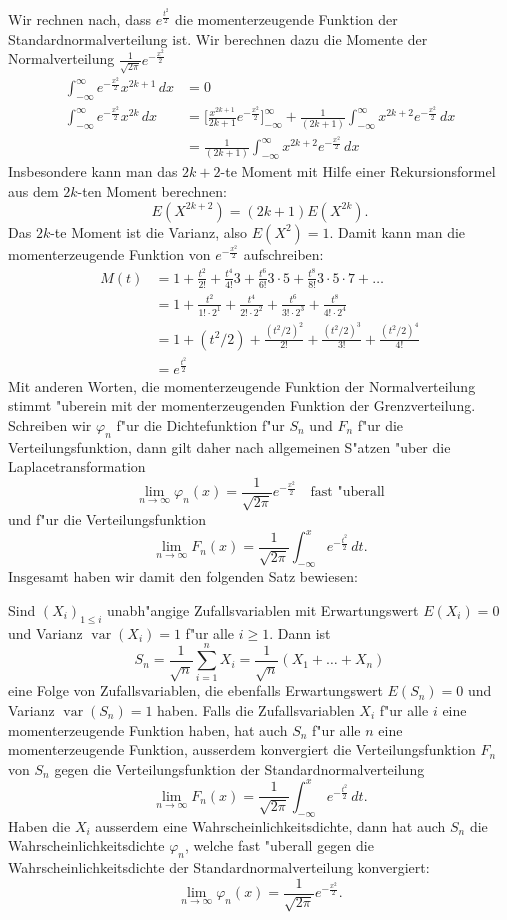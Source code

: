 Wir rechnen nach, dass $e^{\frac{t^2}2}$ die momenterzeugende Funktion
der Standardnormalverteilung ist.
Wir berechnen
dazu die Momente der Normalverteilung $\frac1{\sqrt{2\pi}}e^{-\frac{x^2}2}$
\begin{align*}
\int_{-\infty}^\infty e^{-\frac{x^2}2}x^{2k+1}\,dx&=0\\
\int_{-\infty}^\infty e^{-\frac{x^2}2}x^{2k}\,dx
&=
\biggl[\frac{x^{2k+1}}{2k+1}e^{-\frac{x^2}2}\biggr]_{-\infty}^\infty
+\frac1{(2k+1)}\int_{-\infty}^\infty x^{2k+2}e^{-\frac{x^2}2}\,dx\\
&=
\frac1{(2k+1)}\int_{-\infty}^\infty x^{2k+2}e^{-\frac{x^2}2}\,dx
\end{align*}
Insbesondere kann man das $2k+2$-te Moment mit Hilfe einer
Rekursionsformel aus dem $2k$-ten Moment berechnen:
\[
E(X^{2k+2})=(2k+1)E(X^{2k}).
\]
Das $2k$-te Moment ist die Varianz, also $E(X^2)=1$.
Damit kann
man die momenterzeugende Funktion von $e^{-\frac{x^2}2}$ aufschreiben:
\begin{align*}
M(t)
&=
1+\frac{t^2}{2!} +\frac{t^4}{4!}3 +\frac{t^6}{6!}3\cdot5 +\frac{t^8}{8!}3\cdot5\cdot7+\dots\\
&=
1+\frac{t^2}{1!\cdot 2^1} +\frac{t^4}{2! \cdot 2^2} +\frac{t^6}{3!\cdot 2^3}
+\frac{t^8}{4!\cdot 2^4}\\
&=
1+(t^2/2) +\frac{(t^2/2)^2}{2!} +\frac{(t^2/2)^3}{3!}
+\frac{(t^2/2)^4}{4!}\\
&=e^{\frac{t^2}2}
\end{align*}
Mit anderen Worten, die momenterzeugende Funktion der Normalverteilung
stimmt "uberein mit der momenterzeugenden Funktion der Grenzverteilung.
Schreiben wir $\varphi_n$ f"ur die Dichtefunktion f"ur $S_n$ und $F_n$
f"ur die Verteilungsfunktion, dann gilt daher
nach allgemeinen S"atzen "uber die Laplacetransformation
\[
\lim_{n\to\infty}\varphi_n(x)=\frac1{\sqrt{2\pi}}e^{-\frac{x^2}2}
\quad\text{fast "uberall}
\]
und f"ur die Verteilungsfunktion
\[
\lim_{n\to\infty}F_n(x)=\frac1{\sqrt{2\pi}}\int_{-\infty}^xe^{-\frac{t^2}2}\,dt.
\]
Insgesamt haben wir damit den folgenden Satz bewiesen:
\begin{satz}
\label{satz-zentraler-grenzwertsatz}
Sind $(X_i)_{1\le i}$ unabh"angige Zufallsvariablen mit
Erwartungswert $E(X_i)=0$ und Varianz $\operatorname{var}(X_i)=1$
f"ur alle $i\ge 1$.
Dann ist
\[
S_n=\frac1{\sqrt{n}}\sum_{i=1}^nX_i=\frac1{\sqrt{n}}(X_1+\dots+X_n)
\]
eine Folge von Zufallsvariablen, die ebenfalls Erwartungswert $E(S_n)=0$
und Varianz $\operatorname{var}(S_n)=1$ haben.
Falls die Zufallsvariablen
$X_i$
f"ur alle $i$ eine momenterzeugende Funktion haben, hat auch $S_n$
f"ur alle $n$ eine momenterzeugende Funktion, ausserdem konvergiert
die Verteilungsfunktion $F_n$ von $S_n$ gegen die Verteilungsfunktion der
Standardnormalverteilung
\[
\lim_{n\to\infty}F_n(x)=\frac1{\sqrt{2\pi}}\int_{-\infty}^xe^{-\frac{t^2}2}\,dt.
\]
Haben die $X_i$ ausserdem eine Wahrscheinlichkeitsdichte,
dann hat auch $S_n$
die Wahrscheinlichkeitsdichte $\varphi_n$, welche fast "uberall gegen die
Wahrscheinlichkeitsdichte der Standardnormalverteilung 
konvergiert:
\[
\lim_{n\to\infty}\varphi_n(x)=\frac1{\sqrt{2\pi}}e^{-\frac{x^2}2}.
\]
\end{satz}
